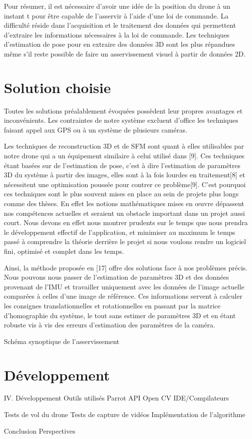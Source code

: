 \documentclass[10pt,a4paper]{report}
\begin{document}
		Pour résumer, il est nécessaire d'avoir une idée de la position du drone à un instant t pour être capable de l'asservir à l'aide d'une loi de commande. La difficulté réside dans l'acquisition et le traitement des données qui permettent d'extraire les informations nécessaires à la loi de commande. Les techniques d'estimation de pose pour en extraire des données 3D sont les plus répandues même s'il reste possible de faire un asservissement visuel à partir de données 2D.
	
\newpage

\section{Solution choisie}

		Toutes les solutions préalablement évoquées possèdent leur propres avantages et inconvénients. Les contraintes de notre système excluent d'office les techniques faisant appel aux GPS ou à un système de plusieurs caméras. 
		
		Les techniques de reconstruction 3D et de SFM sont quant à elles utilisables par notre drone qui a un équipement similaire à celui utilisé dans [9]. Ces techniques étant basées sur de l'estimation de pose, c'est à dire l'estimation de paramètres 3D du système à partir des images, elles sont à la fois lourdes en traitement[8] et nécessitent une optimisation poussée pour contrer ce problème[9]. C'est pourquoi ces techniques sont le plus souvent mises en place au sein de projets plus longs comme des thèses. En effet les notions mathématiques mises en œuvre dépassent nos compétences actuelles et seraient un obstacle important dans un projet aussi court. Nous devons en effet nous montrer prudents sur le temps que nous prendra le développement effectif de l'application, et minimiser au maximum le temps passé à comprendre la théorie derrière le projet si nous voulons rendre un logiciel fini, optimisé et complet dans les temps.
		
		Ainsi, la méthode proposée en [17] offre des solutions face à nos problèmes précis. Nous pouvons nous passer de l'estimation de paramètres 3D et des données provenant de l'IMU et travailler uniquement avec  les données de l'image actuelle comparées à celles d'une image de référence. Ces informations servent à calculer les consignes translationnelles et rotationnelles en passant par la matrice d'homographie du système, le tout sans estimer de paramètres 3D et en étant robuste vis à vis des erreurs d'estimation des paramètres de la caméra.
		



	Schéma synoptique de l'asservissement
	

\section{Développement}	

IV. Développement
	Outils utilisés
		Parrot API
		Open CV
		IDE/Compilateurs
			
	Tests de vol du drone
	Tests de capture de vidéos
	Implémentation de l'algorithme
	
Conclusion
	Perspectives
\end{document}
